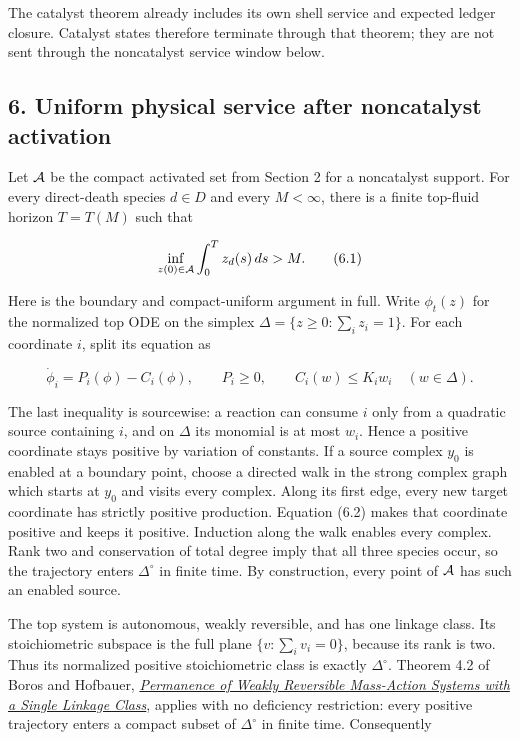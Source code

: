 The catalyst theorem already includes its own shell service and expected
ledger closure. Catalyst states therefore terminate through that
theorem; they are not sent through the noncatalyst service window below.

\subsection{6. Uniform physical service after noncatalyst
activation}

Let \({\cal A}\) be the compact activated set from Section 2 for a
noncatalyst support. For every direct-death species \(d\in D\) and every
\(M<\infty\), there is a finite top-fluid horizon \(T=T(M)\) such that

\[
      \inf_{z(0)\in{\cal A}}\int_0^Tz_d(s)\,ds>M.    \tag{6.1}
\]

Here is the boundary and compact-uniform argument in full. Write
\(\phi_t(z)\) for the normalized top ODE on the simplex
\(\Delta=\{z\ge0:\sum_i z_i=1\}\). For each coordinate \(i\), split its
equation as

\[
 \dot \phi_i=P_i(\phi)-C_i(\phi),\qquad
 P_i\ge0,\qquad C_i(w)\le K_iw_i\quad(w\in\Delta).  \tag{6.2}
\]

The last inequality is sourcewise: a reaction can consume \(i\) only
from a quadratic source containing \(i\), and on \(\Delta\) its monomial
is at most \(w_i\). Hence a positive coordinate stays positive by
variation of constants. If a source complex \(y_0\) is enabled at a
boundary point, choose a directed walk in the strong complex graph which
starts at \(y_0\) and visits every complex. Along its first edge, every
new target coordinate has strictly positive production. Equation (6.2)
makes that coordinate positive and keeps it positive. Induction along
the walk enables every complex. Rank two and conservation of total
degree imply that all three species occur, so the trajectory enters
\(\Delta^\circ\) in finite time. By construction, every point of
\({\cal A}\) has such an enabled source.

The top system is autonomous, weakly reversible, and has one linkage
class. Its stoichiometric subspace is the full plane
\(\{v:\sum_i v_i=0\}\), because its rank is two. Thus its normalized
positive stoichiometric class is exactly \(\Delta^\circ\). Theorem 4.2
of Boros and Hofbauer,
\href{https://doi.org/10.1137/19M1248431}{\emph{Permanence of Weakly
Reversible Mass-Action Systems with a Single Linkage Class}}, applies
with no deficiency restriction: every positive trajectory enters a
compact subset of \(\Delta^\circ\) in finite time. Consequently

